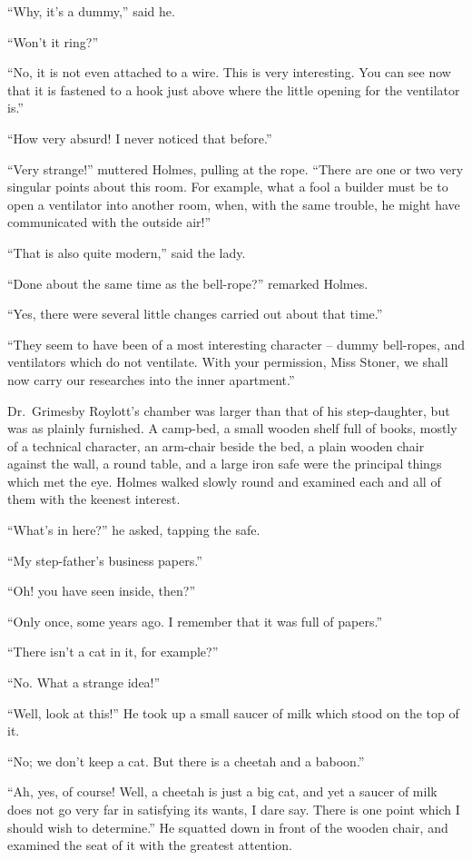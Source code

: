 “Why, it’s a dummy,” said he.

“Won’t it ring?”

“No, it is not even attached to a wire. This is very interesting.
You can see now that it is fastened to a hook just
above where the little opening for the ventilator is.”

“How very absurd! I never noticed that before.”

“Very strange!” muttered Holmes, pulling at the rope.
“There are one or two very singular points about this room.
For example, what a fool a builder must be to open a ventilator
into another room, when, with the same trouble, he might
have communicated with the outside air!”

“That is also quite modern,” said the lady.

“Done about the same time as the bell-rope?” remarked
Holmes.

“Yes, there were several little changes carried out about
that time.”

“They seem to have been of a most interesting character -- dummy
bell-ropes, and ventilators which do not ventilate.
With your permission, Miss Stoner, we shall now carry our
researches into the inner apartment.”

Dr.\ Grimesby Roylott’s chamber was larger than that of his
step-daughter, but was as plainly furnished. A camp-bed, a
small wooden shelf full of books, mostly of a technical character,
an arm-chair beside the bed, a plain wooden chair against
the wall, a round table, and a large iron safe were the principal
things which met the eye. Holmes walked slowly round
and examined each and all of them with the keenest interest.

“What’s in here?” he asked, tapping the safe.

“My step-father’s business papers.”

“Oh! you have seen inside, then?”

“Only once, some years ago. I remember that it was full
of papers.”

“There isn’t a cat in it, for example?”

“No. What a strange idea!”

“Well, look at this!” He took up a small saucer of milk
which stood on the top of it.

“No; we don’t keep a cat. But there is a cheetah and a
baboon.”

“Ah, yes, of course! Well, a cheetah is just a big cat, and
yet a saucer of milk does not go very far in satisfying its
wants, I dare say. There is one point which I should wish to
determine.” He squatted down in front of the wooden chair,
and examined the seat of it with the greatest attention.


